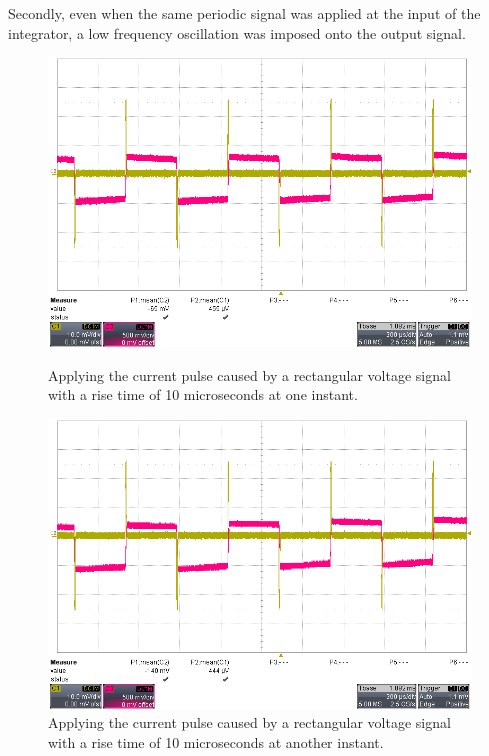 Secondly, even when the same periodic signal was applied at the input of the integrator, a low frequency oscillation was imposed onto the output signal.
\begin{figure}[htbp]
 \centering
 \begin{minipage}{0.4\textwidth}
 \includegraphics[scale=0.2]{figures/Results/Integrator_measurements/currentwave_10u}
 \caption[Kurze Abbildungsbeschreibung]{Applying the current pulse caused by a rectangular voltage signal with a rise time of 10 microseconds at one instant. }
 \end{minipage}\qquad
 \begin{minipage}{0.4\textwidth}
 \includegraphics[scale=0.2]{figures/Results/Integrator_measurements/cuwave_10u-4}
 \caption[Kurze Abbildungsbeschreibung]{Applying the current pulse caused by a rectangular voltage signal with a rise time of 10 microseconds at another instant.}
 \end{minipage}
 
  
\end{figure}

